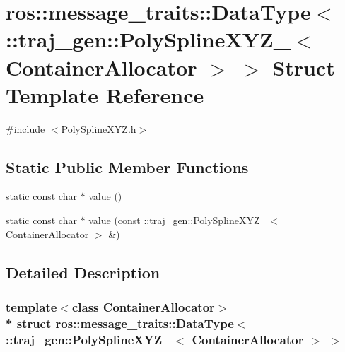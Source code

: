 \hypertarget{structros_1_1message__traits_1_1_data_type_3_01_1_1traj__gen_1_1_poly_spline_x_y_z___3_01_container_allocator_01_4_01_4}{}\section{ros\+:\+:message\+\_\+traits\+:\+:Data\+Type$<$ \+:\+:traj\+\_\+gen\+:\+:Poly\+Spline\+X\+Y\+Z\+\_\+$<$ Container\+Allocator $>$ $>$ Struct Template Reference}
\label{structros_1_1message__traits_1_1_data_type_3_01_1_1traj__gen_1_1_poly_spline_x_y_z___3_01_container_allocator_01_4_01_4}


{\ttfamily \#include $<$Poly\+Spline\+X\+Y\+Z.\+h$>$}

\subsection*{Static Public Member Functions}
\begin{DoxyCompactItemize}
\item 
static const char $\ast$ \hyperlink{structros_1_1message__traits_1_1_data_type_3_01_1_1traj__gen_1_1_poly_spline_x_y_z___3_01_container_allocator_01_4_01_4_aad7ae669852627b5d93b6db20f4734a0}{value} ()
\item 
static const char $\ast$ \hyperlink{structros_1_1message__traits_1_1_data_type_3_01_1_1traj__gen_1_1_poly_spline_x_y_z___3_01_container_allocator_01_4_01_4_aef66fdb342509b0f76cde06cca36fed6}{value} (const \+::\hyperlink{structtraj__gen_1_1_poly_spline_x_y_z__}{traj\+\_\+gen\+::\+Poly\+Spline\+X\+Y\+Z\+\_\+}$<$ Container\+Allocator $>$ \&)
\end{DoxyCompactItemize}


\subsection{Detailed Description}
\subsubsection*{template$<$class Container\+Allocator$>$\\*
struct ros\+::message\+\_\+traits\+::\+Data\+Type$<$ \+::traj\+\_\+gen\+::\+Poly\+Spline\+X\+Y\+Z\+\_\+$<$ Container\+Allocator $>$ $>$}



